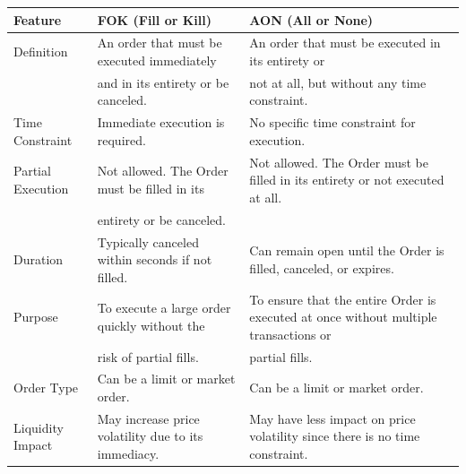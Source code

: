 \documentclass[11pt]{article}
\begin{document}
\begin{center}
\begin{tabular}{lll}
\hline
Feature & FOK (Fill or Kill) & AON (All or None)\\[0pt]
\hline
Definition & An order that must be executed immediately & An order that must be executed in its entirety or\\[0pt]
 & and in its entirety or be canceled. & not at all, but without any time constraint.\\[0pt]
\hline
Time Constraint & Immediate execution is required. & No specific time constraint for execution.\\[0pt]
\hline
Partial Execution & Not allowed. The Order must be filled in its & Not allowed. The Order must be filled in its entirety or not executed at all.\\[0pt]
 & entirety or be canceled. & \\[0pt]
\hline
Duration & Typically canceled within seconds if not filled. & Can remain open until the Order is filled, canceled, or expires.\\[0pt]
\hline
Purpose & To execute a large order quickly without the & To ensure that the entire Order is executed at once without multiple transactions or\\[0pt]
 & risk of partial fills. & partial fills.\\[0pt]
\hline
Order Type & Can be a limit or market order. & Can be a limit or market order.\\[0pt]
\hline
Liquidity Impact & May increase price volatility due to its immediacy. & May have less impact on price volatility since there is no time constraint.\\[0pt]
\hline
\end{tabular}
\end{center}
\end{document}
